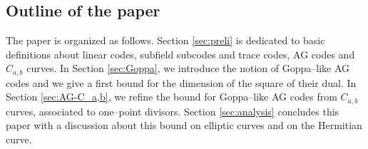 \documentclass[a4paper]{amsart}
\theoremstyle{definition}
\theoremstyle{remark}
\newcommand{\calP}{\mathcal{P}}
\newcommand{\F}{\mathbb{F}}
\begin{document}
%
%			
%			
%			
%			
%			
%			
%			
%			
%			
%			
%			
%			
%			
%



\subsection*{Outline of the paper}

The paper is organized as follows. Section \ref{sec:preli} is dedicated to basic definitions about linear codes, subfield subcodes and trace codes, AG codes and $C_{a,b}$ curves. In Section \ref{sec:Goppa}, we introduce the notion of Goppa--like AG codes and we give a first bound for the dimension of the square of their dual. In Section \ref{sec:AG-C_a,b}, we refine the bound for Goppa--like AG codes from $C_{a,b}$ curves, associated to one--point divisors. Section \ref{sec:analysis} concludes this paper with a discussion about this bound on elliptic curves and on the Hermitian curve.
\end{document}
